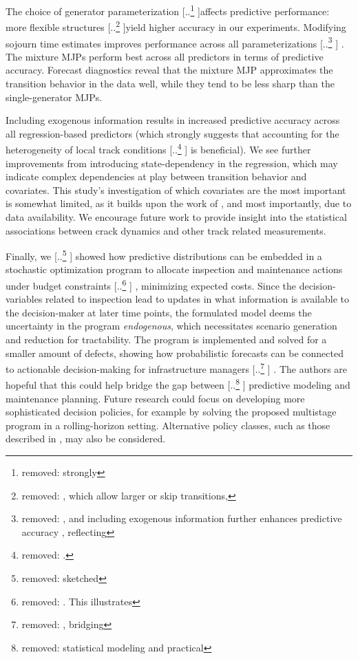 \documentclass{article}
\providecommand{\DIFadd}[1]{{\protect\color{blue} \sf #1}} %
\providecommand{\DIFdel}[1]{{\protect\color{red} [..\footnote{removed: #1} ]}} %
\providecommand{\DIFaddbegin}{} %
\providecommand{\DIFaddend}{} %
\providecommand{\DIFdelbegin}{} %
\providecommand{\DIFdelend}{} %
\begin{document}
The choice of generator parameterization \DIFdelbegin \DIFdel{strongly }\DIFdelend affects predictive performance: more flexible structures \DIFdelbegin \DIFdel{, which allow larger or skip transitions, }\DIFdelend yield higher accuracy \DIFaddbegin \DIFadd{in our experiments}\DIFaddend . Modifying sojourn time estimates improves performance across all parameterizations\DIFdelbegin \DIFdel{, and including exogenous information further enhances predictive accuracy , reflecting }\DIFdelend \DIFaddbegin \DIFadd{. 
The mixture MJPs perform best across all predictors in terms of predictive accuracy. Forecast diagnostics reveal that the mixture MJP approximates the transition behavior in the data well, while they tend to be less sharp than the single-generator MJPs.
}

\DIFadd{Including exogenous information results in increased predictive accuracy across all regression-based predictors (which strongly suggests that accounting for }\DIFaddend the heterogeneity of local track conditions \DIFdelbegin \DIFdel{.
}\DIFdelend \DIFaddbegin \DIFadd{is beneficial). We see further improvements from introducing state-dependency in the regression, which may indicate complex dependencies at play between transition behavior and covariates. This study's investigation of which covariates are the most important is somewhat limited, as it builds upon the work of \citet{bisgaard2024A}, and most importantly, due to data availability. We encourage future work to provide insight into the statistical associations between crack dynamics and other track related measurements.
}\DIFaddend 

Finally, we \DIFdelbegin \DIFdel{sketched }\DIFdelend \DIFaddbegin \DIFadd{showed }\DIFaddend how predictive distributions can be embedded in a stochastic optimization program to allocate inspection and maintenance actions under budget constraints\DIFdelbegin \DIFdel{. This illustrates }\DIFdelend \DIFaddbegin \DIFadd{, minimizing expected costs. 
Since the decision-variables related to inspection lead to updates in what information is available to the decision-maker at later time points, the formulated model deems the uncertainty in the program \textit{endogenous}, which necessitates scenario generation and reduction for tractability.
The program is implemented and solved for a smaller amount of defects, showing }\DIFaddend how probabilistic forecasts can be connected to actionable decision-making for infrastructure managers\DIFdelbegin \DIFdel{, bridging }\DIFdelend \DIFaddbegin \DIFadd{. The authors are hopeful that this could help bridge }\DIFaddend the gap between \DIFdelbegin \DIFdel{statistical modeling and practical }\DIFdelend \DIFaddbegin \DIFadd{predictive modeling and }\DIFaddend maintenance planning.  \DIFaddbegin \DIFadd{Future research could focus on developing more sophisticated decision policies, for example by solving the proposed multistage program in a rolling-horizon setting. Alternative policy classes, such as those described in \citet{powell2018a}, may also be considered.
}\DIFaddend 
\end{document}
